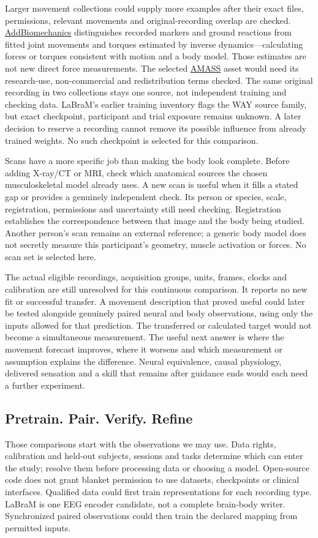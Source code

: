 Larger movement collections could supply more examples after their exact files, permissions, relevant movements and original-recording overlap are checked. \href{https://www.addbiomechanics.org/download_data.html}{AddBiomechanics} distinguishes recorded markers and ground reactions from fitted joint movements and torques estimated by inverse dynamics---calculating forces or torques consistent with motion and a body model. Those estimates are not new direct force measurements. The selected \href{https://amass.is.tue.mpg.de/license.html}{AMASS} asset would need its research-use, non-commercial and redistribution terms checked. The same original recording in two collections stays one source, not independent training and checking data. LaBraM's earlier training inventory flags the WAY source family, but exact checkpoint, participant and trial exposure remains unknown. A later decision to reserve a recording cannot remove its possible influence from already trained weights. No such checkpoint is selected for this comparison.

Scans have a more specific job than making the body look complete. Before adding X-ray/CT or MRI, check which anatomical sources the chosen musculoskeletal model already uses. A new scan is useful when it fills a stated gap or provides a genuinely independent check. Its person or species, scale, registration, permissions and uncertainty still need checking. Registration establishes the correspondence between that image and the body being studied. Another person's scan remains an external reference; a generic body model does not secretly measure this participant's geometry, muscle activation or forces. No scan set is selected here.

The actual eligible recordings, acquisition groups, units, frames, clocks and calibration are still unresolved for this continuous comparison. It reports no new fit or successful transfer. A movement description that proved useful could later be tested alongside genuinely paired neural and body observations, using only the inputs allowed for that prediction. The transferred or calculated target would not become a simultaneous measurement. The useful next answer is where the movement forecast improves, where it worsens and which measurement or assumption explains the difference. Neural equivalence, causal physiology, delivered sensation and a skill that remains after guidance ends would each need a further experiment.

\subsection{Pretrain. Pair. Verify. Refine}
Those comparisons start with the observations we may use. Data rights,
calibration and held-out subjects, sessions and tasks determine which can
enter the study; resolve them before processing data or choosing a model.
Open-source code does not grant blanket permission to use datasets,
checkpoints or clinical interfaces. Qualified data could first train
representations for each recording type. LaBraM is one EEG encoder candidate,
not a complete brain-body writer. Synchronized paired observations could
then train the declared mapping from permitted inputs.

